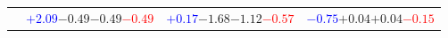 \documentclass[compress]{beamer}
\begin{document}
\begin{frame}
\begin{tabular}{r | c | c | c}
          & \textcolor{blue}{$+2.09$}\hspace{0.1 cm}$-0.49$\hspace{0.1 cm}$-0.49$\hspace{0.1 cm}\textcolor{red}{$-0.49$} & \textcolor{blue}{$+0.17$}\hspace{0.1 cm}$-1.68$\hspace{0.1 cm}$-1.12$\hspace{0.1 cm}\textcolor{red}{$-0.57$} & \textcolor{blue}{$-0.75$}\hspace{0.1 cm}$+0.04$\hspace{0.1 cm}$+0.04$\hspace{0.1 cm}\textcolor{red}{$-0.15$} \\
\end{tabular}
\end{frame}
\end{document}
